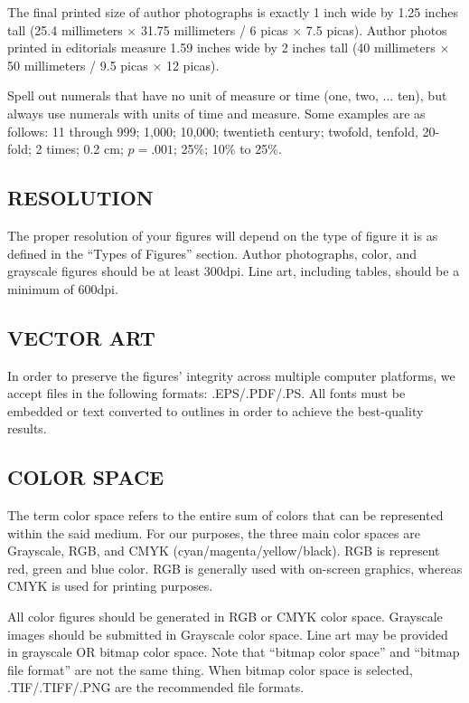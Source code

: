 \documentclass{IEEEjmw}
\begin{document}
The final printed size of author photographs is exactly 1 inch wide by 1.25 inches tall (25.4 millimeters $\times$ 31.75 millimeters / 6 picas $\times$ 7.5 picas). Author photos printed in editorials measure 1.59 inches wide by 2 inches tall (40 millimeters $\times$ 50 millimeters / 9.5 picas $\times$ 12 picas).

Spell out numerals that have no unit of measure or time (one,  two, ... ten),  but  always  use  numerals  with  units  of time  and  measure.  Some  examples are as follows: 11 through 999; 1,000; 10,000;  twentieth  century;  twofold, tenfold, 20-fold; 2 times; 0.2 cm; $p=.001$; 25\%; 10\% to 25\%.


\subsection{RESOLUTION}

The proper resolution of your figures will depend on the type of figure it is as defined in the ``Types of Figures'' section. Author photographs, color, and grayscale figures should be at least 300dpi. Line art, including tables, should be a minimum of 600dpi.

\subsection{VECTOR ART}

In order to preserve the figures' integrity across multiple computer platforms, we accept files in the following formats: .EPS/.PDF/.PS. All fonts must be embedded or text converted to outlines in order to achieve the best-quality results.

\subsection{COLOR SPACE}

The term color space refers to the entire sum of colors that can be represented within the said medium. For our purposes, the three main color spaces are Grayscale, RGB, and CMYK (cyan/magenta/yellow/black). RGB is  represent red, green and blue color. RGB is generally used with on-screen graphics, whereas CMYK is used for printing purposes.

All color figures should be generated in RGB or CMYK color space. Grayscale images should be submitted in Grayscale color space. Line art may be provided in grayscale OR bitmap color space. Note that ``bitmap color space'' and ``bitmap file format'' are not the same thing. When bitmap color space is selected, .TIF/.TIFF/.PNG are the recommended file formats.
\end{document}
